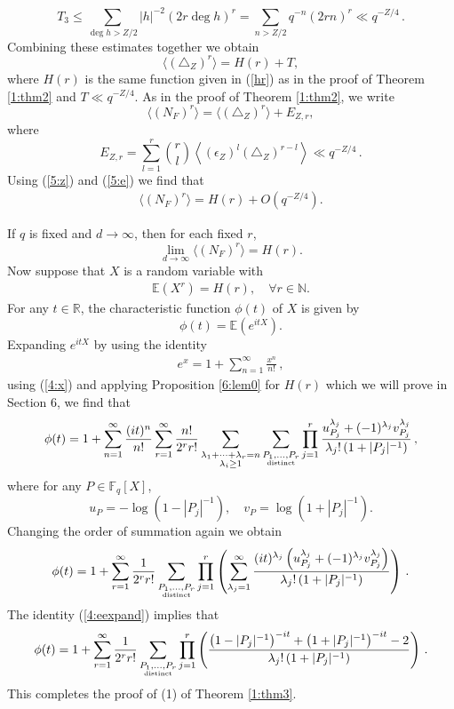 \documentclass[12pt]{amsart}
\theoremstyle{plain}
\newcommand{\N}{{\mathbb N}}
\newcommand{\R}{{\mathbb R}}
\newcommand{\F}{{\mathbb F}_q}
\newcommand{\E}{{\mathbb E}}
\begin{document}
\[T_3 \le \sum_{\deg h >Z/2} |h|^{-2} (2r \deg h)^r =\sum_{n >Z/2} q^{-n}(2rn)^r \ll q^{-Z/4}\,.\]
Combining these estimates together we obtain
\[\langle (\triangle_Z)^r\rangle=H(r)+T, \]
where $H(r)$ is the same function given in (\ref{hr}) as in the proof of Theorem \ref{1:thm2} and $T \ll q^{-Z/4}$. As in the proof of Theorem \ref{1:thm2}, we write
\[\langle (N_F)^r \rangle=\langle (\triangle_Z)^r \rangle +E_{Z,r},\]
where
\[E_{Z,r}=\sum_{l=1}^r \binom{r}{l} \left\langle (\epsilon_Z)^l(\triangle_Z)^{r-l}\right\rangle \ll q^{-Z/4}\,.\]
Using (\ref{5:z}) and (\ref{5:e}) we find that
\begin{eqnarray} \label{5:nfr} \langle (N_F)^r \rangle=H(r)+O\left(q^{-Z/4}\right).\end{eqnarray}

If $q$ is fixed and $d \to \infty$, then for each fixed $r$,
\[\lim_{d \to \infty}\langle (N_F)^r \rangle=H(r). \]
Now suppose that $X$ is a random variable with
\begin{eqnarray} \label{4:x} \E(X^r) =H(r), \quad \forall r \in \N.\end{eqnarray}
For any $t \in \R$, the characteristic function $\phi(t)$ of $X$ is given by
\[\phi(t)=\E\left(e^{itX}\right).\]
Expanding $e^{itX}$ by using the identity
\begin{eqnarray} \label{4:eexpand} e^x=1+\sum_{n=1}^{\infty}\frac{x^n}{n!}\,,\end{eqnarray}
using (\ref{4:x}) and applying Proposition \ref{6:lem0} for $H(r)$ which we will prove in Section 6, we find that
\[\phi(t)=1+\sum_{n=1}^{\infty} \frac{(it)^n}{n!}\sum_{r=1}^{\infty} \frac{n!}{2^r r!} \sum_{\substack{\lambda_1+\cdots+\lambda_r=n\\ \lambda_i \ge 1}} \sum_{\substack{P_1,\ldots,P_r\\ \mbox{\tiny distinct}}} \prod_{j=1}^r \frac{u_{P_j}^{\lambda_j}+(-1)^{\lambda_j}v_{P_j}^{\lambda_j}}{\lambda_j! \left(1+|P_j|^{-1}\right)}\,,\]
where for any $P \in \F[X]$,
\[u_P=-\log\left(1-|P_j|^{-1}\right), \quad v_P=\log\left(1+|P_j|^{-1}\right).\]
Changing the order of summation again we obtain
\[\phi(t)=1+\sum_{r=1}^{\infty} \frac{1}{2^r r!} \sum_{\substack{P_1,\ldots,P_r\\ \mbox{\tiny distinct}}} \prod_{j=1}^r \left(\sum_{\lambda_j=1}^{\infty} \frac{(it)^{\lambda_j} \left(u_{P_j}^{\lambda_j}+(-1)^{\lambda_j}v_{P_j}^{\lambda_j}\right)}{\lambda_j! \left(1+|P_j|^{-1}\right)} \right)\,.\]
The identity (\ref{4:eexpand}) implies that
\[\phi(t)=1+\sum_{r=1}^{\infty} \frac{1}{2^rr!} \sum_{\substack{P_1,\ldots,P_r\\ \mbox{\tiny distinct}}} \prod_{j=1}^r \left( \frac{\left(1-|P_j|^{-1}\right)^{-it}+\left(1+|P_j|^{-1}\right)^{-it}-2}{\lambda_j! \left(1+|P_j|^{-1}\right)} \right)\,.\]
This completes the proof of (1) of Theorem \ref{1:thm3}.
\end{document}
